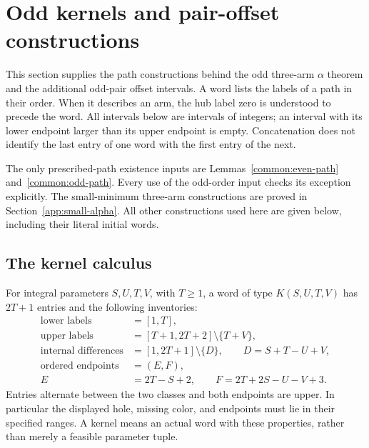 \section{Odd kernels and pair-offset constructions}
\label{ok:chapter}\label{app:odd-kernels}

This section supplies the path constructions behind the odd three-arm
$\alpha$ theorem and the additional odd-pair offset intervals. A word
lists the labels of a path in their order. When it describes an arm,
the hub label zero is understood to precede the word. All intervals
below are intervals of integers; an interval with its lower endpoint
larger than its upper endpoint is empty. Concatenation does not
identify the last entry of one word with the first entry of the next.

The only prescribed-path existence inputs are Lemmas~\ref{common:even-path}
and~\ref{common:odd-path}. Every use of the odd-order input checks its
exception explicitly. The small-minimum three-arm constructions are
proved in Section~\ref{app:small-alpha}. All other constructions used
here are given below, including their literal initial words.

\subsection{The kernel calculus}
\label{ok:calculus}

\begin{definition}\label{ok:kernel-definition}
For integral parameters $S,U,T,V$, with $T\ge1$, a word of type
$K(S,U,T,V)$ has $2T+1$ entries and the following inventories:
\begin{align}
 \text{lower labels}&=[1,T], \nonumber\\
 \text{upper labels}&=[T+1,2T+2]\setminus\{T+V\},\label{ok:kernel-labels}\\
 \text{internal differences}
   &=[1,2T+1]\setminus\{D\},
 \qquad D=S+T-U+V, \label{ok:kernel-colors}\\
 \text{ordered endpoints}&=(E,F),\nonumber\\
 E&=2T-S+2,\qquad F=2T+2S-U-V+3. \label{ok:kernel-ends}
\end{align}
Entries alternate between the two classes and both endpoints are
upper. In particular the displayed hole, missing color, and endpoints
must lie in their specified ranges. A kernel means an actual word
with these properties, rather than merely a feasible parameter tuple.
\end{definition}

